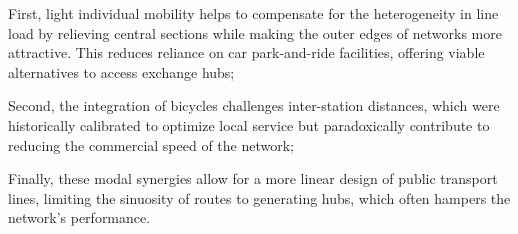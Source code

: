 \begin{refsegment}
\begin{customitemize}
    \item First, light individual mobility helps to compensate for the heterogeneity in line load by relieving central sections while making the outer edges of networks more attractive. This reduces reliance on car park-and-ride facilities, offering viable alternatives to access exchange hubs;
    \item Second, the integration of bicycles challenges inter-station distances, which were historically calibrated to optimize local service but paradoxically contribute to reducing the commercial speed of the network;
    \item Finally, these modal synergies allow for a more linear design of public transport lines, limiting the sinuosity of routes to generating hubs, which often hampers the network's performance.
\end{customitemize}%


\end{refsegment}
